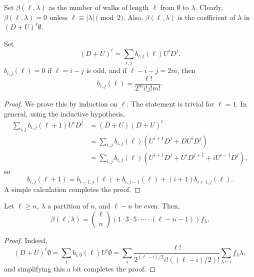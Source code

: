 Set $\beta(\ell,\lambda)$ as the number of walks of length $\ell$ from $\emptyset$ to $\lambda$. Clearly, $\beta(\ell,\lambda) = 0$ unless $\ell \equiv |\lambda| \pmod{2}$. Also, $\beta(\ell,\lambda)$ is the coefficient of $\lambda$ in $(D+U)^\ell \emptyset$.
\begin{flem}
	Set
	\[ (D+U)^\ell = \sum_{i,j} b_{i,j}(\ell) U^i D^j. \]
	$b_{i,j}(\ell) = 0$ if $\ell = i-j$ is odd, and if $\ell-i-j = 2m$, then
	\[ b_{i,j}(\ell) = \frac{\ell!}{2^m i! j! m!}. \]
\end{flem}
\begin{proof}
	We prove this by induction on $\ell$. The statement is trivial for $\ell = 1$. In general, using the inductive hypothesis,
	\begin{align*}
		\sum_{i,j} b_{i,j}(\ell+1) U^i D^j &= (D+U) (D+U)^{\ell} \\
			&= \sum_{i,j} b_{i,j}(\ell) (U^{i+1} D^j + D U^i D^j) \\
			&= \sum_{i,j} b_{i,j}(\ell) (U^{i+1} D^j + U^i D^{j+1} + i U^{i-1} D^j),
	\end{align*}
	so
	\[ b_{i,j}(\ell+1) = b_{i-1,j}(\ell) + b_{i,j-1}(\ell) + (i+1) b_{i+1,j}(\ell). \]
	A simple calculation completes the proof.
\end{proof}

\begin{fcor}
	Let $\ell \ge n$, $\lambda$ a partition of $n$, and $\ell-n$ be even. Then,
	\[ \beta(\ell,\lambda) = \binom{\ell}{n} (1 \cdot 3 \cdot 5 \cdot \cdots \cdot (\ell-n-1)) f_\lambda. \]
\end{fcor}
\begin{proof}
	Indeed,
	\[ (D+U)^\ell \emptyset = \sum_{i} b_{i,0}(\ell) U^i \emptyset = \sum_{i} \frac{\ell!}{2^{(\ell-i)/2} i! ((\ell-i)/2)!} \sum_{\lambda \vdash i} f_\lambda \lambda, \]
	and simplifying this a bit completes the proof.
\end{proof}